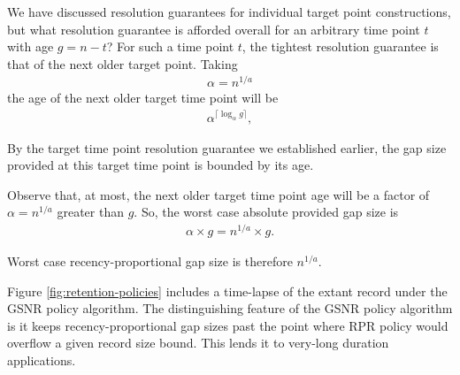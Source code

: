 We have discussed resolution guarantees for individual target point constructions, but what resolution guarantee is afforded overall for an arbitrary time point $t$ with age $g = n - t$?
For such a time point $t$, the tightest resolution guarantee is that of the next older target point.
Taking
\begin{align*}
\alpha = n^{1/a}
\end{align*}
the age of the next older target time point will be
\begin{align*}
\alpha^{ \lceil \log_{\alpha} g \rceil },
\end{align*}

By the target time point resolution guarantee we established earlier, the gap size provided at this target time point is bounded by its age.

Observe that, at most, the next older target time point age will be a factor of $\alpha = n^{1/a}$ greater than $g$.
So, the worst case absolute provided gap size is
\begin{align*}
\alpha \times g = n^{1/a} \times g.
\end{align*}

Worst case recency-proportional gap size is therefore $n^{1/a}$.

Figure \ref{fig:retention-policies} includes a time-lapse of the extant record under the GSNR policy algorithm.
The distinguishing feature of the GSNR policy algorithm is it keeps recency-proportional gap sizes past the point where RPR policy would overflow a given record size bound.
This lends it to very-long duration applications.

% 
% 
% 

% 
% 


